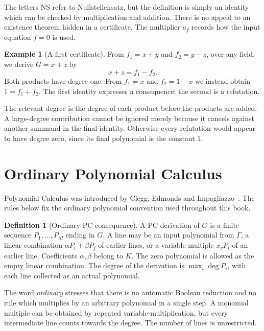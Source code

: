 \documentclass[11pt,a4paper,oneside,openany]{book}
\theoremstyle{definition}\newtheorem{definition}[theorem]{Definition}
\newtheorem{example}[theorem]{Example}
\theoremstyle{remark}\newtheorem{remark}[theorem]{Remark}
\numberwithin{equation}{chapter}
\begin{document}
The letters NS refer to Nullstellensatz, but the definition is simply
an identity which can be checked by multiplication and addition. There
is no appeal to an existence theorem hidden in a certificate. The
multiplier $a_f$ records how the input equation $f=0$ is used.

\begin{example}[A first certificate]\label{tx:eg:first-NS}
From $f_1=x+y$ and $f_2=y-z$, over any field, we derive $G=x+z$ by
\[
                       x+z=f_1-f_2.
\]
Both products have degree one. From $f_1=x$ and $f_2=1-x$ we instead
obtain $1=f_1+f_2$. The first identity expresses a consequence; the
second is a refutation.
\end{example}

The relevant degree is the degree of each product before the products
are added. A large-degree contribution cannot be ignored merely because
it cancels against another summand in the final identity. Otherwise
every refutation would appear to have degree zero, since its final
polynomial is the constant $1$.

\section{Ordinary Polynomial Calculus}
Polynomial Calculus was introduced by Clegg, Edmonds and
Impagliazzo~\cite{PCFoundations}. The rules below fix the ordinary
polynomial convention used throughout this book.
\begin{definition}[Ordinary-PC consequence]\label{tx:def:PC}
A PC derivation of $G$ is a finite sequence $P_1,\ldots,P_M$ ending in
$G$. A line may be an input polynomial from $\Gamma$, a linear
combination $\alpha P_i+\beta P_j$ of earlier lines, or a variable
multiple $x_vP_i$ of an earlier line. Coefficients $\alpha,\beta$ belong
to $K$. The zero polynomial is allowed as the empty linear combination.
The degree of the derivation is $\max_i\deg P_i$, with each line
collected as an actual polynomial.
\end{definition}

The word \emph{ordinary} stresses that there is no automatic Boolean
reduction and no rule which multiplies by an arbitrary polynomial in a
single step. A monomial multiple can be obtained by repeated variable
multiplication, but every intermediate line counts towards the degree.
The number of lines is unrestricted.
\end{document}
